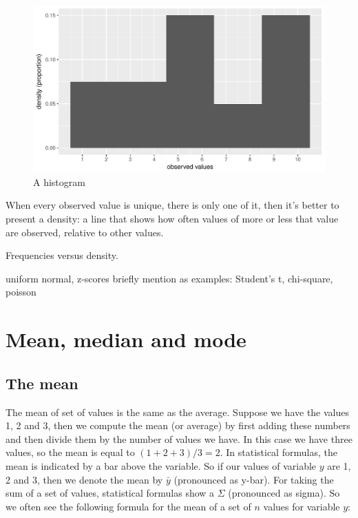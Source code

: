 \documentclass[]{report}\usepackage[]{graphicx}\usepackage[]{color}
\makeatletter
\def\maxwidth{ %
  \ifdim\Gin@nat@width>\linewidth
    \linewidth
  \else
    \Gin@nat@width
  \fi
}
\newenvironment{knitrout}{}{} %
\makeatother
\begin{document}
\begin{knitrout}
\color{fgcolor}\begin{figure}

{\centering \includegraphics[width=\maxwidth]{figure/distr_3-1} 

}

\caption[A histogram]{A histogram}\label{fig:distr_3}
\end{figure}


\end{knitrout}


When every observed value is unique, there is only one of it, then it's better to present a density: a line that shows how often values of more or less that value are observed, relative to other values.


Frequencies versus density.

uniform
normal, 
z-scores
briefly mention as examples: Student's t, chi-square, poisson

\section{Mean, median and mode}

\subsection{The mean}
The mean of set of values is the same as the average. Suppose we have the values 1, 2 and 3, then we compute the mean (or average) by first adding these numbers and then divide them by the number of values we have. In this case we have three values, so the mean is equal to $(1 + 2 + 3)/3 = 2$. In statistical formulas, the mean is indicated by a bar above the variable. So if our values of variable $y$ are 1, 2 and 3, then we denote the mean by $\bar{y}$ (pronounced as y-bar). For taking the sum of a set of values, statistical formulas show a $\Sigma$ (pronounced as sigma). So we often see the following formula for the mean of a set of $n$ values for variable $y$:
\end{document}
